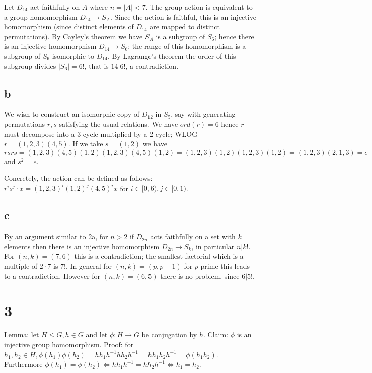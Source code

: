 \documentclass{article}
\def\inv{{-1}}
\begin{document}
Let $D_{14}$ act faithfully on $A$ where $n = |A| < 7$. The group action is equivalent to a group homomorphism $D_{14} \to S_A$. Since the action is faithful, this is an injective homomorphism (since distinct elements of $D_{14}$ are mapped to distinct permutations). By Cayley's theorem we have $S_A$ is a subgroup of $S_6$; hence there is an injective homomorphism $D_{14} \to S_6$; the range of this homomorphism is a subgroup of $S_6$ isomorphic to $D_{14}$. By Lagrange's theorem the order of this subgroup divides $|S_6| = 6!$, that is $14 | 6!$, a contradiction.

\subsection*{b}

We wish to construct an isomorphic copy of $D_{12}$ in $S_5$, say with generating permutations $r, s$ satisfying the usual relations. We have $ord(r) = 6$ hence $r$ must decompose into a 3-cycle multiplied by a 2-cycle; WLOG $r = (1,2,3)(4, 5)$. If we take $s = (1, 2)$ we have $rsrs = (1,2,3)(4, 5)(1, 2)(1,2,3)(4, 5)(1, 2) = (1,2,3)(1,2)(1,2,3)(1,2) = (1,2,3)(2,1,3) = e$ and $s^2 = e$.

Concretely, the action can be defined as follows: $r^i s^j \cdot x = (1, 2, 3)^i(1, 2)^j(4, 5)^ix$ for $i \in [0, 6), j \in [0, 1)$.

\subsection*{c}

By an argument similar to 2a, for $n > 2$ if $D_{2n}$ acts faithfully on a set with $k$ elements then there is an injective homomorphism $D_{2n} \to S_k$, in particular $n | k!$. For $(n, k) = (7, 6)$ this is a contradiction; the smallest factorial which is a multiple of $2 \cdot 7$ is $7!$. In general for $(n, k) = (p, p-1)$ for $p$ prime this leads to a contradiction. However for $(n, k) = (6, 5)$ there is no problem, since $6 | 5!$.

\section*{3}

Lemma: let $H \le G, h \in G$ and let $\phi: H \to G$ be conjugation by $h$. Claim: $\phi$ is an injective group homomorphism. Proof: for $h_1, h_2 \in H, \phi(h
_1)\phi(h_2) = hh_1h^\inv hh_2h^\inv = hh_1h_2h^\inv = \phi(h_1 h_2)$. Furthermore $\phi(h_1) = \phi(h_2) \iff hh_1h^\inv = hh_2h^\inv \iff h_1 = h_2$.
\end{document}
